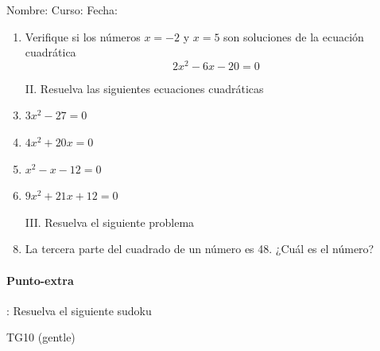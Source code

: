 \documentclass[fleqn]{article}
\newcommand{\LineaNombre}{%
\par
\vspace{\baselineskip}
Nombre:\hrulefill \; Curso: \underline{\hspace*{48pt}} \; Fecha: \underline{\hspace*{2.5cm}} \relax
\par}
\begin{document}
\LineaNombre
\begin{enumerate}
 \item Verifique si los números $x=-2$ \; y \; $x=5$ son soluciones de la ecuación cuadrática \[2x^{2}-6x-20=0\] \noanswer

\item[II.] Resuelva las siguientes ecuaciones cuadráticas
 \item $3x^{2}-27=0$\noanswer
 \item $4x^{2}+20x=0$\noanswer
 \newpage
 \item $x^{2}-x-12=0$\noanswer
 \item $9x^{2}+21x+12=0$\noanswer
 \item[III.] Resuelva el siguiente problema
 \item La tercera parte del cuadrado de un número es 48. ¿Cuál es el número?\noanswer
 \end{enumerate}
 \begin{minipage}{.4\textwidth}
\paragraph*{Punto-extra}: Resuelva el siguiente sudoku 
 \end{minipage}
 \cluefont{\Large}
\begin{minipage}{.55\textwidth}
\begin{minipage}{0.45\linewidth}\begin{center}
TG10 (gentle) \\
\end{center}\end{minipage}
\end{minipage}
\end{document}
